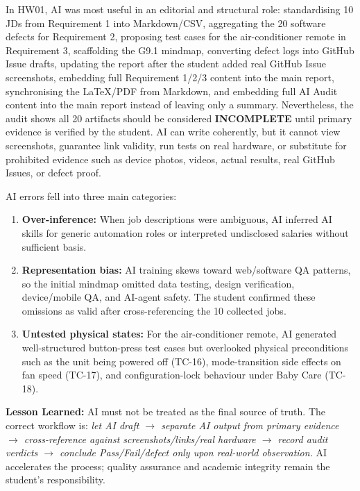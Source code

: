 \documentclass[12pt, a4paper]{article}
\begin{document}
In HW01, AI was most useful in an editorial and structural role: standardising 10 JDs from Requirement 1 into Markdown/CSV, aggregating the 20 software defects for Requirement 2, proposing test cases for the air-conditioner remote in Requirement 3, scaffolding the G9.1 mindmap, converting defect logs into GitHub Issue drafts, updating the report after the student added real GitHub Issue screenshots, embedding full Requirement 1/2/3 content into the main report, synchronising the \LaTeX{}/PDF from Markdown, and embedding full AI Audit content into the main report instead of leaving only a summary. Nevertheless, the audit shows all 20 artifacts should be considered \textbf{INCOMPLETE} until primary evidence is verified by the student. AI can write coherently, but it cannot view screenshots, guarantee link validity, run tests on real hardware, or substitute for prohibited evidence such as device photos, videos, actual results, real GitHub Issues, or defect proof.

AI errors fell into three main categories:

\begin{enumerate}[leftmargin=*, itemsep=4pt]
  \item \textbf{Over-inference:} When job descriptions were ambiguous, AI inferred AI skills for generic automation roles or interpreted undisclosed salaries without sufficient basis.
  \item \textbf{Representation bias:} AI training skews toward web/software QA patterns, so the initial mindmap omitted data testing, design verification, device/mobile QA, and AI-agent safety. The student confirmed these omissions as valid after cross-referencing the 10 collected jobs.
  \item \textbf{Untested physical states:} For the air-conditioner remote, AI generated well-structured button-press test cases but overlooked physical preconditions such as the unit being powered off (TC-16), mode-transition side effects on fan speed (TC-17), and configuration-lock behaviour under Baby Care (TC-18).
\end{enumerate}

\begin{infobox}
\textbf{Lesson Learned:} AI must not be treated as the final source of truth. The correct workflow is: \emph{let AI draft $\to$ separate AI output from primary evidence $\to$ cross-reference against screenshots/links/real hardware $\to$ record audit verdicts $\to$ conclude Pass/Fail/defect only upon real-world observation.} AI accelerates the process; quality assurance and academic integrity remain the student's responsibility.
\end{infobox}
\end{document}
